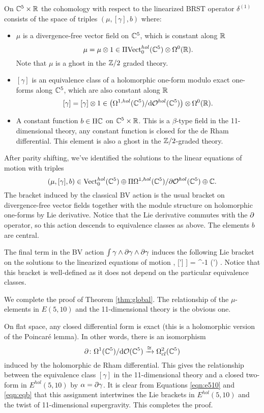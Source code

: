 \documentclass[11pt]{amsart}
\begin{document}
On $\mathbb C^5 \times \mathbb R$ the cohomology with respect to the linearized BRST operator $\delta^{(1)}$ consists of the space of triples $(\mu, [\gamma], b)$ where:
\begin{itemize}
\item $\mu$ is a divergence-free vector field on $\mathbb C^5$, which is constant along $\mathbb R$
\[
\mu = \mu \otimes 1 \in \Pi {\rm Vect}^{hol}_0(\mathbb C^5) \otimes \Omega^0(\mathbb R) .
\]
Note that $\mu$ is a ghost in the $\mathbb Z/2$ graded theory. 
\item $[\gamma]$ is an equivalence class of a holomorphic one-form modulo exact one-forms along $\mathbb C^5$, which are also constant along $\mathbb R$
\[
[\gamma] = [\gamma] \otimes 1 \in \left(\Omega^{1,hol}(\mathbb C^5) / {\rm d} \mathcal O^{hol}(\mathbb C^5) \right) \otimes \Omega^0(\mathbb R) .
\]
\item A constant function $b \in \Pi \mathbb C$ on $\mathbb C^5 \times \mathbb R$.
This is a $\beta$-type field in the 11-dimensional theory, any constant function is closed for the de Rham differential. 
This element is also a ghost in the $\mathbb Z/2$-graded theory. 
\end{itemize}

\parsec[]

After parity shifting, we've identified the solutions to the linear equations of motion with triples
\[
(\mu, [\gamma], b) \in {\rm Vect}^{hol}_0(\mathbb C^5) \oplus \Pi \Omega^{1,hol}(\mathbb C^5) / \partial \mathcal O^{hol}(\mathbb C^5) \oplus \mathbb C .
\]
The bracket induced by the classical BV action is the usual bracket on divergence-free vector fields together with the module structure on holomorphic one-forms by Lie derivative.
Notice that the Lie derivative commutes with the $\partial$ operator, so this action descends to equivalence classes as above. 
The elements $b$ are central. 

The final term in the BV action $\int \gamma \wedge \partial \gamma \wedge \partial \gamma$ induces the following Lie bracket on the solutions to the linearized equations of motion
\beqn\label{eqn:eqb}
\big[[\gamma], [\gamma'] \big] = \Omega^{-1} \vee (\del \gamma \wedge \del \gamma') .
\eeqn
Notice that this bracket is well-defined as it does not depend on the particular equivalence classes. 

\parsec[]

We complete the proof of Theorem \ref{thm:global}. 
The relationship of the $\mu$-elements in $E(5,10)$ and the 11-dimensional theory is the obvious one.

On flat space, any closed differential form is exact (this is a holomorphic version of the Poincar\'e lemma). 
In other words, there is an isomorphism
\[
\partial \colon \Omega^1 (\mathbb C^5) / {\rm d} \mathcal O(\mathbb C^5) \xrightarrow{\cong} \Omega^{2}_{cl}(\mathbb C^5)
\]
induced by the holomorphic de Rham differential.
This gives the relationship between the equivalence class $[\gamma]$ in the 11-dimensional theory and a closed two-form in $E^{hol}(5,10)$ by $\alpha = \partial \gamma$. 
It is clear from Equations \eqref{eqn:e510} and \eqref{eqn:eqb} that this assignment intertwines the Lie brackets in $E^{hol}(5,10)$ and the twist of 11-dimensional supergravity. 
This completes the proof. 
\end{document}

